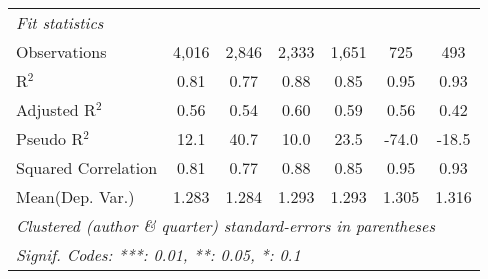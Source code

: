 \begin{tabular}{lcccccc}
   \midrule
   \emph{Fit statistics}\\
   Observations                                               & 4,016        & 2,846         & 2,333         & 1,651         & 725     & 493\\  
   R$^2$                                                      & 0.81         & 0.77          & 0.88          & 0.85          & 0.95    & 0.93\\  
   Adjusted R$^2$                                             & 0.56         & 0.54          & 0.60          & 0.59          & 0.56    & 0.42\\  
   Pseudo R$^2$                                               & 12.1         & 40.7          & 10.0          & 23.5          & -74.0   & -18.5\\  
   Squared Correlation                                        & 0.81         & 0.77          & 0.88          & 0.85          & 0.95    & 0.93\\  
Mean(Dep. Var.) & 1.283 & 1.284 & 1.293 & 1.293 & 1.305 & 1.316 \\
   \midrule \midrule
   \multicolumn{7}{l}{\emph{Clustered (author \& quarter) standard-errors in parentheses}}\\
   \multicolumn{7}{l}{\emph{Signif. Codes: ***: 0.01, **: 0.05, *: 0.1}}\\
\end{tabular}
\par\endgroup
